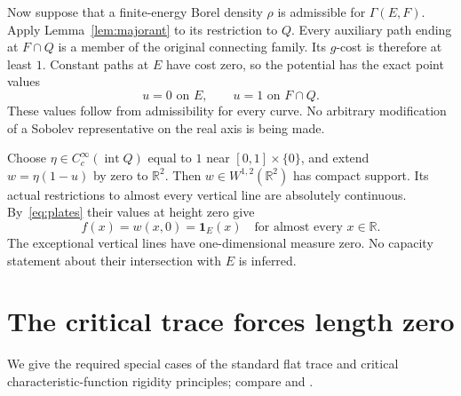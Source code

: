 \documentclass[11pt]{article}
\newcommand{\R}{\mathbb R}
\newcommand{\ind}{\mathbf 1}
\begin{document}
Now suppose that a finite-energy Borel density $\rho$ is admissible for
$\Gamma(E,F)$. Apply Lemma~\ref{lem:majorant} to its restriction to $Q$.
Every auxiliary path ending at $F\cap Q$ is a member of the original
connecting family. Its $g$-cost is therefore at least $1$. Constant paths
at $E$ have cost zero, so the potential has the exact point values
\begin{equation}\label{eq:plates}
 u=0\text{ on }E,\qquad u=1\text{ on }F\cap Q.
\end{equation}
These values follow from admissibility for every curve. No arbitrary
modification of a Sobolev representative on the real axis is being made.

Choose $\eta\in C_c^\infty(\operatorname{int}Q)$ equal to $1$ near
$[0,1]\times\{0\}$, and extend $w=\eta(1-u)$ by zero to $\R^2$.
Then $w\in W^{1,2}(\R^2)$ has compact support. Its actual restrictions to
almost every vertical line are absolutely continuous. By~\eqref{eq:plates}
their values at height zero give
\begin{equation}\label{eq:trace}
 f(x)=w(x,0)=\ind_E(x)\quad\text{for almost every }x\in\R.
\end{equation}
The exceptional vertical lines have one-dimensional measure zero. No
capacity statement about their intersection with $E$ is inferred.

\section{The critical trace forces length zero}

We give the required special cases of the standard flat trace and critical
characteristic-function rigidity principles; compare
\cite[Propositions 3.4 and 3.8]{DNPV} and
\cite[Corollaries 1--2 and Remark 3]{Brezis}.
\end{document}
